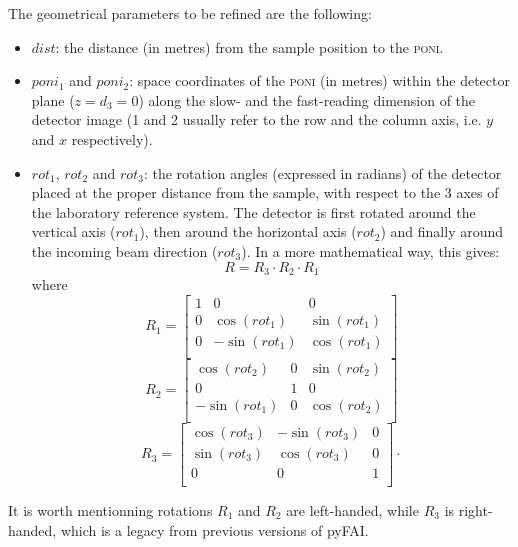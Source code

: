 \documentclass[preprint]{iucr}              %
\begin{document}
The geometrical parameters to be refined are the following:
\begin{itemize}
  \item $dist$: the distance (in metres) from the sample position to the
  \textsc{poni}.
  \item $poni_1$ and $poni_2$: space coordinates of the
  \textsc{poni} (in metres) within the detector plane ($z=d_3=0$) along the slow-
  and the fast-reading dimension of the detector image (1 and 2 usually refer to the row
  and the column axis, i.e. $y$ and $x$ respectively).
  \item $rot_1$, $rot_2$ and $rot_3$: the
  rotation angles (expressed in radians) of the detector placed at the proper
  distance from the sample, with respect to the 3 axes of the
  laboratory reference system.
  The detector is first rotated around the vertical axis ($rot_1$), then
  around the horizontal axis ($rot_2$) and finally around the
  incoming beam direction ($rot_3$). In a more mathematical way, this gives:
\begin{equation}
	R = R_3 \cdot R_2 \cdot R_1 
\end{equation}
where
\begin{equation}
	R_1 = 	
	\begin{bmatrix}
	1 & 0 & 0\\
	0 & \cos(rot_1) & \sin(rot_1) \\
	0 & -\sin(rot_1) & \cos(rot_1) \\
	\end{bmatrix}
\end{equation}
\begin{equation} 		
	R_2 =
	\begin{bmatrix}
	\cos(rot_2) & 0 & \sin(rot_2) \\
	0 & 1 & 0 \\
	-\sin(rot_1)&0 & \cos(rot_2) \\
	\end{bmatrix}
\end{equation}
\begin{equation} 	
	R_3 =
	\begin{bmatrix}
	\cos(rot_3) & -\sin(rot_3) & 0 \\
	\sin(rot_3) & \cos(rot_3) & 0\\
	0 & 0 & 1\\
	\end{bmatrix}
	\cdot 
\end{equation}

\end{itemize}
It is worth mentionning rotations $R_1$ and $R_2$ are left-handed, while 
$R_3$ is right-handed, which is a legacy from previous versions of pyFAI.
\end{document}
